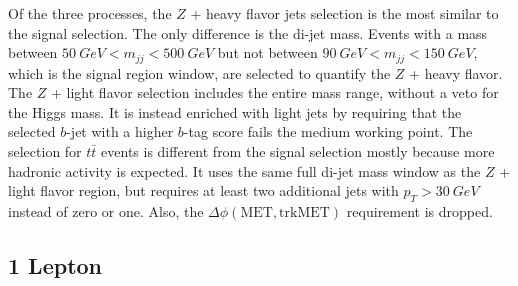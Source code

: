 Of the three processes,
the $Z$ + heavy flavor jets selection is the most similar to the signal selection.
The only difference is the di-jet mass.
Events with a mass between $\SI{50}{GeV} < m_{jj} < \SI{500}{GeV}$ but not between
$\SI{90}{GeV} < m_{jj} < \SI{150}{GeV}$, which is the signal region window,
are selected to quantify the $Z$ + heavy flavor.
The $Z$ + light flavor selection includes the entire mass range,
without a veto for the Higgs mass.
It is instead enriched with light jets by requiring that the selected $b$-jet with
a higher $b$-tag score fails the medium working point.
The selection for $t\bar{t}$ events is different from the signal selection
mostly because more hadronic activity is expected.
It uses the same full di-jet mass window as the $Z$ + light flavor region,
but requires at least two additional jets with $p_T > \SI{30}{GeV}$ instead of zero or one.
Also, the $\Delta \phi(\mathrm{MET}, \mathrm{trkMET})$ requirement is dropped.

\subsection{1 Lepton} \label{sec:resolved-1}

